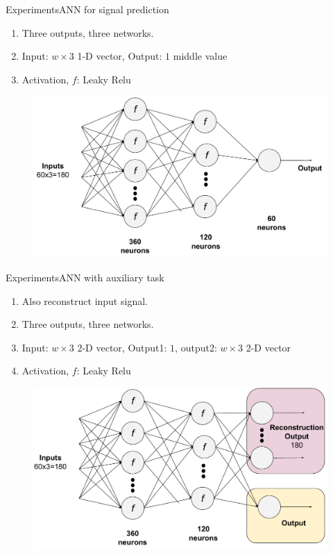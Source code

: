 \documentclass[handout]{beamer}
\begin{document}
\begin{frame}{Experiments}{ANN for signal prediction}
  \begin{enumerate}
    \item Three outputs, three networks.
    \item Input: $w\times3$ 1-D vector, Output: $1$ middle value
    \item Activation, $f$: Leaky Relu
  \end{enumerate}
  \begin{center}
    \begin{figure}
    \includegraphics[scale=0.35]{images/motor_ann_1}
    \end{figure}
  \end{center}
\end{frame}

\begin{frame}{Experiments}{ANN with auxiliary task}
  \begin{enumerate}
    \item Also reconstruct input signal.
    \item Three outputs, three networks.
    \item Input: $w\times3$ 2-D vector, Output1: $1$, output2: $w\times3$ 2-D vector
    \item Activation, $f$: Leaky Relu
  \end{enumerate}
  \begin{center}
    \begin{figure}
    \includegraphics[scale=0.35]{images/motor_recon}
    \end{figure}
  \end{center}
\end{frame}
\end{document}
